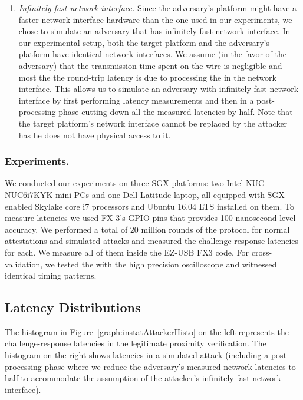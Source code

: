 \begin{enumerate}
	\item \emph{Infinitely fast network interface.} Since the adversary's platform might have a faster network interface hardware than the one used in our experiments, we chose to simulate an adversary that has infinitely fast network interface. In our experimental setup, both the target platform and the adversary's platform have identical network interfaces. We assume (in the favor of the adversary) that the transmission time spent on the wire is negligible and most the the round-trip latency is due to processing the in the network interface. This allows us to simulate an adversary with infinitely fast network interface by first performing latency measurements and then in a post-processing phase cutting down all the measured latencies by half. Note that the target platform's network interface cannot be replaced by the attacker has he does not have physical access to it.
\end{enumerate}

\subsubsection{Experiments.}
We conducted our experiments on three SGX platforms: two Intel NUC NUC6i7KYK mini-PCs and one Dell Latitude laptop, all equipped with SGX-enabled Skylake core i7 processors and Ubuntu 16.04 LTS installed on them. To measure latencies we used FX-3's GPIO pins that provides 100 nanosecond level accuracy. We performed a total of $20$ million rounds of the protocol for normal attestations and simulated attacks and measured the challenge-response latencies for each. We measure all of them inside the EZ-USB FX3 code. For cross-validation, we tested the \device with the high precision oscilloscope and witnessed identical timing patterns.


\subsection{Latency Distributions}
\label{sec:evaluation:results}



The histogram in Figure~\ref{graph:instatAttackerHisto} on the left represents the challenge-response latencies in the legitimate proximity verification. The histogram on the right shows latencies in a simulated attack (including a post-processing phase where we reduce the adversary's measured network latencies to half to accommodate the assumption of the attacker's infinitely fast network interface).

